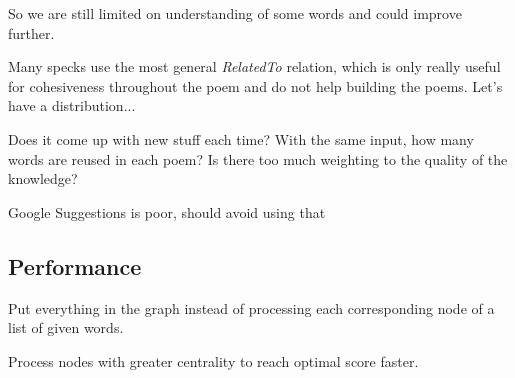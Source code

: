 So we are still limited on understanding of some words and could improve further.

Many specks use the most general \textit{RelatedTo} relation, which is only really useful for cohesiveness throughout the poem and do not help building the poems. Let's have a distribution...

Does it come up with new stuff each time? With the same input, how many words are reused in each poem? Is there too much weighting to the quality of the knowledge?

Google Suggestions is poor, should avoid using that

\subsection{Performance}
Put everything in the graph instead of processing each corresponding node of a list of given words.

Process nodes with greater centrality to reach optimal score faster.



